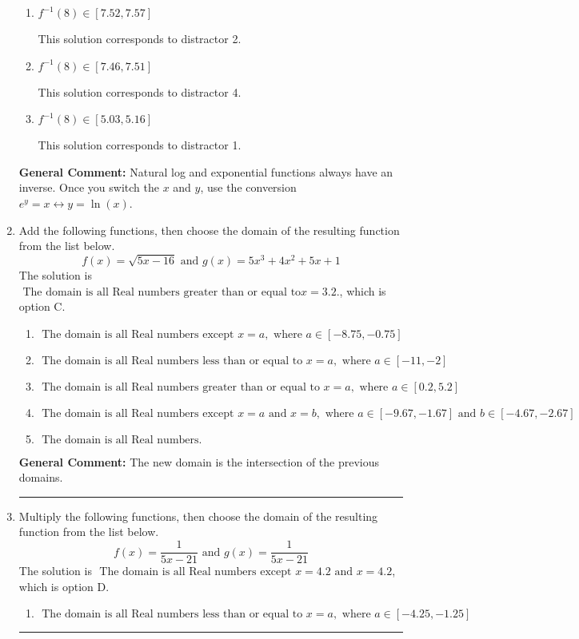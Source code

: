 \documentclass{extbook}[14pt]
\newcommand{\litem}[1]{\item #1

\rule{\textwidth}{0.4pt}}
\begin{document}
\begin{enumerate}
{\begin{enumerate}[label=\Alph*.]
 This solution corresponds to distractor 3.
\item \( f^{-1}(8) \in [7.52, 7.57] \)

 This solution corresponds to distractor 2.
\item \( f^{-1}(8) \in [7.46, 7.51] \)

 This solution corresponds to distractor 4.
\item \( f^{-1}(8) \in [5.03, 5.16] \)

 This solution corresponds to distractor 1.
\end{enumerate}

\textbf{General Comment:} Natural log and exponential functions always have an inverse. Once you switch the $x$ and $y$, use the conversion $ e^y = x \leftrightarrow y=\ln(x)$.
}
\litem{
Add the following functions, then choose the domain of the resulting function from the list below.
\[ f(x) = \sqrt{5x-16}  \text{ and } g(x) = 5x^{3} +4 x^{2} +5 x + 1 \]The solution is \( \text{ The domain is all Real numbers greater than or equal to} x = 3.2. \), which is option C.\begin{enumerate}[label=\Alph*.]
\item \( \text{ The domain is all Real numbers except } x = a, \text{ where } a \in [-8.75, -0.75] \)


\item \( \text{ The domain is all Real numbers less than or equal to } x = a, \text{ where } a \in [-11, -2] \)


\item \( \text{ The domain is all Real numbers greater than or equal to } x = a, \text{ where } a \in [0.2, 5.2] \)


\item \( \text{ The domain is all Real numbers except } x = a \text{ and } x = b, \text{ where } a \in [-9.67, -1.67] \text{ and } b \in [-4.67, -2.67] \)


\item \( \text{ The domain is all Real numbers. } \)


\end{enumerate}

\textbf{General Comment:} The new domain is the intersection of the previous domains.
}
\litem{
Multiply the following functions, then choose the domain of the resulting function from the list below.
\[ f(x) = \frac{1}{5x-21} \text{ and } g(x) = \frac{1}{5x-21} \]The solution is \( \text{ The domain is all Real numbers except } x = 4.2 \text{ and } x = 4.2 \), which is option D.\begin{enumerate}[label=\Alph*.]
\item \( \text{ The domain is all Real numbers less than or equal to } x = a, \text{ where } a \in [-4.25, -1.25] \)



\end{enumerate}}
\end{enumerate}
\end{document}
